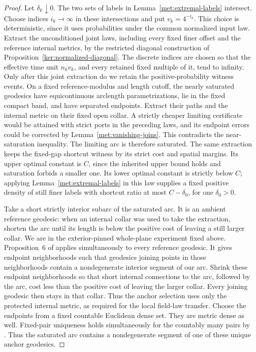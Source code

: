 \begin{proof}
Let $\delta_k\downarrow0$.  The two sets of labels in
Lemma~\ref{met:extremal-labels} intersect.  Choose indices $i_k\to\infty$
in these intersections and put $v_k=4^{-i_k}$.  This choice is deterministic,
since it uses probabilities under the common normalized input law.
Extract the unconditioned joint laws, including every fixed finer
offset and the reference internal metrics, by the restricted diagonal
construction of Proposition~\ref{ker:normalized-diagonal}.  The discrete indices
are chosen so that the effective time unit $n_kv_k$, and every
retained fixed multiple of it, tend to infinity.  Only after this
joint extraction do we retain the positive-probability witness events.
On a fixed reference-modulus and
length cutoff, the nearly saturated geodesics have equicontinuous
arclength parametrizations, lie in the fixed compact band, and have
separated endpoints.  Extract their paths and the internal metric on
their fixed open collar.  A strictly cheaper limiting certificate
would be attained with strict ports in the preceding laws, and its
endpoint errors could be corrected by
Lemma~\ref{met:vanishing-joins}.  This contradicts the near-saturation
inequality.  The limiting arc is therefore saturated.  The same
extraction keeps the fixed-gap shortcut witness by its strict cost
and spatial margins.  Its upper optimal constant is $C$, since the
inherited upper bound holds and saturation forbids a smaller one.
Its lower optimal constant is strictly below $C$; applying
Lemma~\ref{met:extremal-labels} in this law supplies a fixed positive
density of still finer labels with shortcut ratio at most
$C-\delta_0$, for one $\delta_0>0$.

Take a short strictly interior subarc of the saturated arc.  It is an
ambient reference geodesic: when an internal collar was used to take
the extraction, shorten the arc until its length is below the
positive cost of leaving a still larger collar.  We are in the exterior-pinned whole-plane experiment fixed above.
Proposition~6 of \cite{BhatiaKavvadiasConfluence} applies simultaneously
to every reference geodesic.  It gives endpoint neighborhoods such
that geodesics joining points in those neighborhoods contain a
nondegenerate interior segment of our arc.  Shrink these endpoint
neighborhoods so that short internal connections to the arc, followed
by the arc, cost less than the positive cost of leaving the larger
collar.  Every joining geodesic then stays in that collar.  Thus the
anchor selection uses only the protected internal metric, as required
for the local field-law transfer.  Choose the endpoints from a fixed
countable Euclidean dense set.  They are metric dense as
well.  Fixed-pair uniqueness holds simultaneously for the countably
many pairs by \cite[Theorem~1.2]{MillerQianGeodesics}.  Thus the saturated arc contains
a nondegenerate segment of one of these unique anchor geodesics.


\end{proof}

